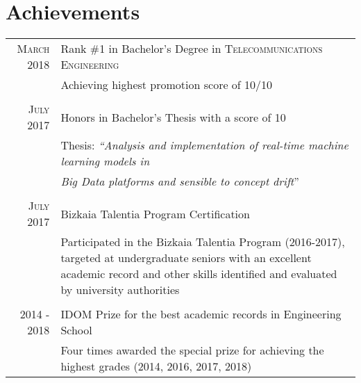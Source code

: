 \documentclass[a4paper,10pt]{article}
\begin{document}

\section{Achievements}
\begin{tabular}{rp{13.6cm}}
\textsc{March} 2018 & Rank \#1 in Bachelor's Degree in \textsc{Telecommunications Engineering} \\%
&\footnotesize{Achieving highest promotion score of 10/10} \\&\\

\textsc{July} 2017 & Honors in Bachelor's Thesis with a score of 10 \\%
& \footnotesize{Thesis: \emph{``Analysis and implementation of real-time machine learning models in}} \\
& \footnotesize{ \hspace{10mm}\emph{ Big Data platforms and sensible to concept drift}'' }\\&\\

\textsc{July} 2017 & Bizkaia Talentia Program Certification \\%
& \footnotesize{Participated in the Bizkaia Talentia Program (2016-2017), targeted at undergraduate seniors with an excellent \newline academic record and other skills identified and evaluated by university authorities} \\&\\

2014 - 2018 & IDOM Prize for the best academic records in Engineering School\\%
&\footnotesize{ Four times awarded the special prize for achieving the highest grades (2014, 2016, 2017, 2018)} \\
\end{tabular}
\end{document}
